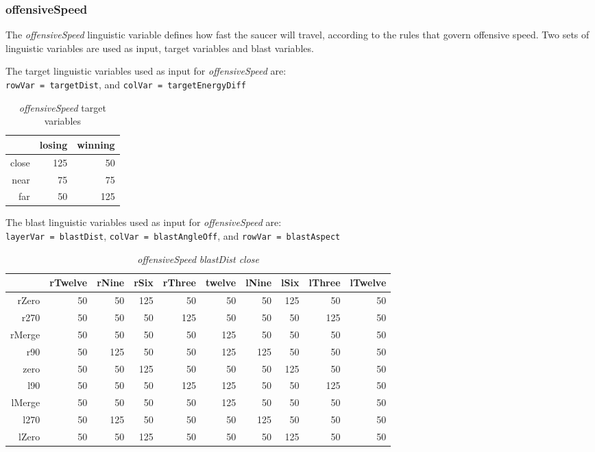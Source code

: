 \subsubsection{offensiveSpeed}

The \emph{offensiveSpeed} linguistic variable defines how fast the saucer will travel, according to the rules that govern offensive speed. Two sets of linguistic variables are used as input, target variables and blast variables.

The target linguistic variables used as input for \emph{offensiveSpeed} are: \\ \texttt{rowVar = targetDist}, and \texttt{colVar = targetEnergyDiff}

\begin{table}[H]
\centering
\caption{\emph{offensiveSpeed} target variables}
\label{Turn rule table}
\begin{tabular}{r|r|r}
 		& losing 	& winning	\\ \hline
close	& 125		& 50		\\
near	& 75		& 75		\\
far		& 50		& 125			
\end{tabular}
\end{table}

The blast linguistic variables used as input for \emph{offensiveSpeed} are: \\ \texttt{layerVar = blastDist}, \texttt{colVar = blastAngleOff}, and \texttt{rowVar = blastAspect}

\begin{table}[H]
\centering
\caption{\emph{offensiveSpeed} \emph{blastDist close}}
\label{Turn rule table}
\begin{tabular}{r|r|r|r|r|r|r|r|r|r}
 		& rTwelve 	& rNine 	& rSix 		& rThree 		& twelve 	& lNine 	& lSix 		& lThree	& lTwelve		\\ \hline
rZero	& 50		& 50		& 125		& 50 		 	& 50		& 50		& 125 		& 50		& 50			\\
r270	& 50		& 50		& 50		& 125			& 50		& 50		& 50		& 125		& 50			\\
rMerge	& 50		& 50		& 50	 	& 50			& 125		& 50		& 50		& 50		& 50			\\
r90		& 50		& 125		& 50 		& 50			& 125		& 125		& 50		& 50		& 50			\\
zero 	& 50		& 50 		& 125 		& 50			& 50		& 50		& 125		& 50		& 50			\\
l90 	& 50		& 50 		& 50		& 125			& 125		& 50		& 50		& 125		& 50			\\
lMerge	& 50		& 50 		& 50	 	& 50			& 125		& 50		& 50		& 50		& 50			\\
l270 	& 50		& 125	 	& 50 		& 50			& 50		& 125		& 50		& 50		& 50			\\
lZero 	& 50		& 50 		& 125	 	& 50			& 50		& 50  		& 125		& 50		& 50			
\end{tabular}
\end{table}

